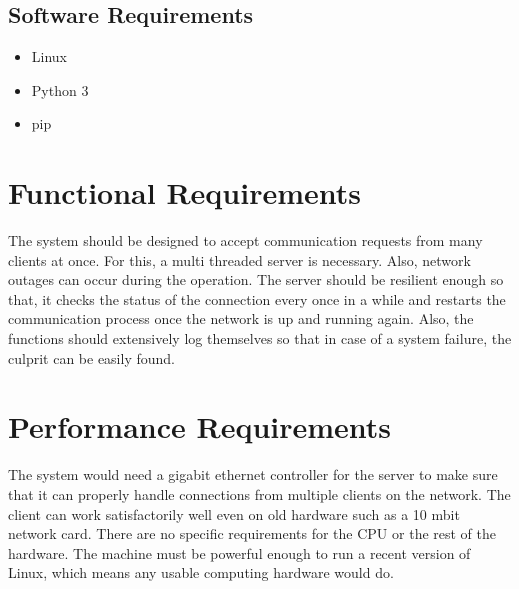 \subsection{Software Requirements}
\begin{itemize}
    \item Linux
    \item Python 3
    \item pip
\end{itemize}

\section{Functional Requirements}
The system should be designed to accept communication requests from many
clients at once. For this, a multi threaded server is necessary. Also, network
outages can occur during the operation. The server should be resilient enough
so that, it checks the status of the connection every once in a while and
restarts the communication process once the network is up and running again.
Also, the functions should extensively log themselves so that in case of a
system failure, the culprit can be easily found.

\section{Performance Requirements}
The system would need a gigabit ethernet controller for the server to make sure
that it can properly handle connections from multiple clients on the network.
The client can work satisfactorily well even on old hardware such as a 10 mbit
network card. There are no specific requirements for the CPU or the rest of the
hardware. The machine must be powerful enough to run a recent version of Linux,
which means any usable computing hardware would do.

